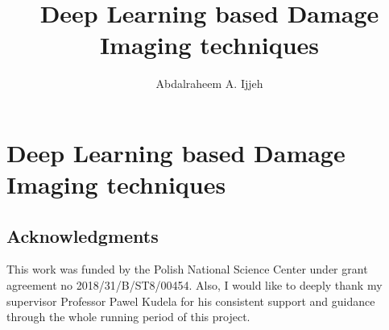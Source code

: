 \documentclass[b5paper, 11pt, openany, titlepage]{book}
\begin{document}
\title{Deep Learning based Damage Imaging techniques}
\author{Abdalraheem A. Ijjeh}
\maketitle
\tableofcontents
\listoffigures
\listoftables

\chapter[DL based Damage Imaging techniques]{Deep Learning based Damage Imaging techniques}
\newpage




\section*{Acknowledgments}
This work was funded by the Polish National Science Center under grant agreement no 2018/31/B/ST8/00454.
Also, I would like to deeply thank my supervisor Professor Pawel Kudela for his consistent support and guidance through the whole running period of this project.
 
 
\end{document}
